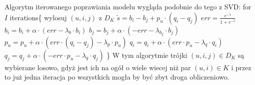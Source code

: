 \documentclass{pracamgr}
\begin{document}
    Algorytm iterowanego poprawiania modelu wygląda podobnie do tego z SVD:\newline\newline
    \hspace*{16pt}	for $I$ iterations\{\newline
    \hspace*{32pt}		wylosuj $(u,i,j)$ z $D_K$\newline 
    \hspace*{32pt}		$\tilde{s}=b_i-b_j+p_u\cdot(q_i-q_j)$\newline
    \hspace*{32pt}		$err=\frac{e^{-\tilde{s}}}{1+e^{-\tilde{s}}}$\newline
    \hspace*{32pt}		$b_i=b_i+\alpha\cdot(err-\lambda_b\cdot b_i)$\newline
    \hspace*{32pt}		$b_j=b_j+\alpha\cdot(-err-\lambda_{b_2}\cdot b_j)$\newline
    \hspace*{32pt}		$p_u=p_u+\alpha\cdot(err\cdot (q_i-q_j)-\lambda_p\cdot p_u)$\newline
    \hspace*{32pt}		$q_i=q_i+\alpha\cdot(err\cdot p_u-\lambda_q\cdot q_i)$\newline
    \hspace*{32pt}		$q_j=q_j+\alpha\cdot(-err\cdot p_u-\lambda_q\cdot q_j)$\newline
    \hspace*{16pt}	\}\newline
    W tym algorytmie trójki $(u,i,j)\in D_K$ są wybierane losowo, gdyż jest ich na ogół o wiele wiecej niż par $(u,i)\in K$
    i przez to już jedna iteracja po wszystkich mogła by być zbyt droga obliczeniowo.
   
\end{document}
